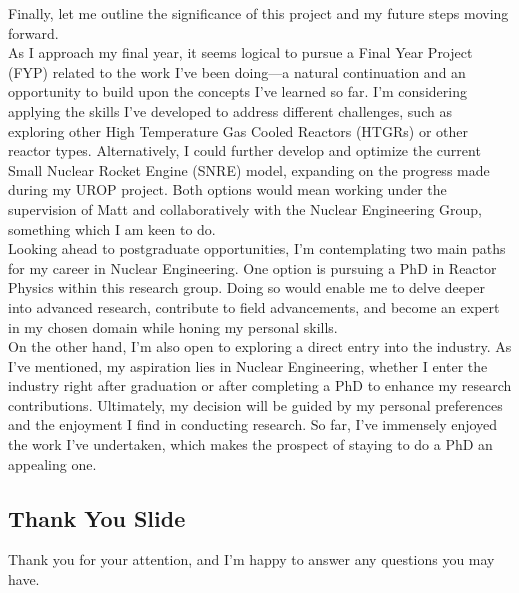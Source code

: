 \documentclass[8pt,a5paper]{article}
\begin{document}
Finally, let me outline the significance of this project and my future steps moving forward.\\

As I approach my final year, it seems logical to pursue a Final Year Project (FYP) related to the work I've been doing—a natural continuation and an opportunity to build upon the concepts I've learned so far. I'm considering applying the skills I've developed to address different challenges, such as exploring other High Temperature Gas Cooled Reactors (HTGRs) or other reactor types. Alternatively, I could further develop and optimize the current Small Nuclear Rocket Engine (SNRE) model, expanding on the progress made during my UROP project. Both options would mean working under the supervision of Matt and collaboratively with the Nuclear Engineering Group, something which I am keen to do. \\

Looking ahead to postgraduate opportunities, I'm contemplating two main paths for my career in Nuclear Engineering. One option is pursuing a PhD in Reactor Physics within this research group. Doing so would enable me to delve deeper into advanced research, contribute to field advancements, and become an expert in my chosen domain while honing my personal skills.\\

On the other hand, I'm also open to exploring a direct entry into the industry. As I've mentioned, my aspiration lies in Nuclear Engineering, whether I enter the industry right after graduation or after completing a PhD to enhance my research contributions. Ultimately, my decision will be guided by my personal preferences and the enjoyment I find in conducting research. So far, I've immensely enjoyed the work I've undertaken, which makes the prospect of staying to do a PhD an appealing one.

\subsection*{Thank You Slide}

Thank you for your attention, and I'm happy to answer any questions you may have.
\end{document}
